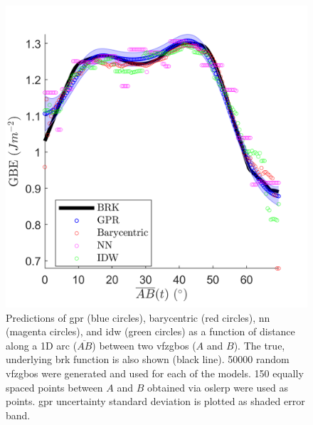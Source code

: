 \documentclass[final,twocolumn,12pt]{elsarticle}
\begin{document}
\begin{figure}[!ht]
    \centering
    \includegraphics{figures/tunnel-50000.png}
    \caption{Predictions of \gls{gpr} (blue circles), barycentric (red circles), \gls{nn} (magenta circles), and \gls{idw} (green circles) as a function of distance along a 1D arc ($\overline{AB}$) between two \glspl{vfzgbo} ($A$ and $B$). The true, underlying \gls{brk} function is also shown (black line). \num{50000} random \inpt{} \glspl{vfzgbo} were generated and used for each of the models. \num{150} equally spaced points between $A$ and $B$ obtained via \gls{oslerp} \cite{francisGeodesicOctonionMetric2019} were used as \outpt{} points. \gls{gpr} uncertainty standard deviation is plotted as shaded error band.}
    \label{fig:tunnel-50000}
\end{figure}
\end{document}
